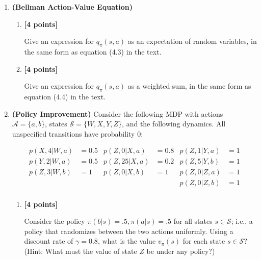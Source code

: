 \documentclass{article}
\newcounter{totalpoints}
\newcommand{\points}[1]{{\addtocounter{totalpoints}{#1}\textbf{[#1 points]}}}
\begin{document}
\begin{enumerate}
\begin{enumerate}
    \item\points{3}
    If you answered episodic to the previous question, describe how to treat the scenario as continuing.
    If you answered continuing to the previous question, describe how to treat the scenario as episodic.
    \begin{answer}{1in}
    \end{answer}
\end{enumerate}


\item \textbf{(Bellman Action-Value Equation)}
\begin{enumerate}
    \item\points{4}
    Give an expression for $q_\pi(s,a)$ as an expectation of random variables, in the same form as equation (4.3) in the text.
    \begin{answer}{.5in}
    \end{answer}

    \item\points{4}
    Give an expression for $q_\pi(s,a)$ as a weighted sum, in the same form as equation (4.4) in the text.
    \begin{answer}{.5in}
    \end{answer}
\end{enumerate}

\item \textbf{(Policy Improvement)}
Consider the following MDP with actions $\mathcal{A}=\{a,b\}$, states $\mathcal{S}=\{W,X,Y,Z\}$, and the following dynamics.  All unspecified transitions have probability 0:

\begin{align*}
    p(X,4|W,a) &=0.5  & p(Z,0|X,a) &= 0.8    &  p(Z,1|Y,a) &=1 \\
    p(Y,2|W,a) &=0.5  & p(Z,25|X,a) &=0.2   &  p(Z,5|Y,b) &=1 \\
    p(Z,3|W,b) &= 1   & p(Z,0|X,b) &= 1      &  p(Z,0|Z,a) &=1 \\
               &      &            &         &  p(Z,0|Z,b) &=1\\
\end{align*}

\begin{enumerate}
    \item\points{4}
    Consider the policy $\pi(b|s) = .5, \pi(a|s)=.5$ for all states $s\in\mathcal{S}$; i.e., a policy that randomizes between the two actions uniformly.
    Using a discount rate of $\gamma=0.8$, what is the value $v_\pi(s)$ for each state $s\in\mathcal{S}$?
    (Hint: What must the value of state $Z$ be under any policy?)
    \begin{answer}{1.5in}
    \end{answer}


\end{enumerate}
\end{enumerate}
\end{document}
